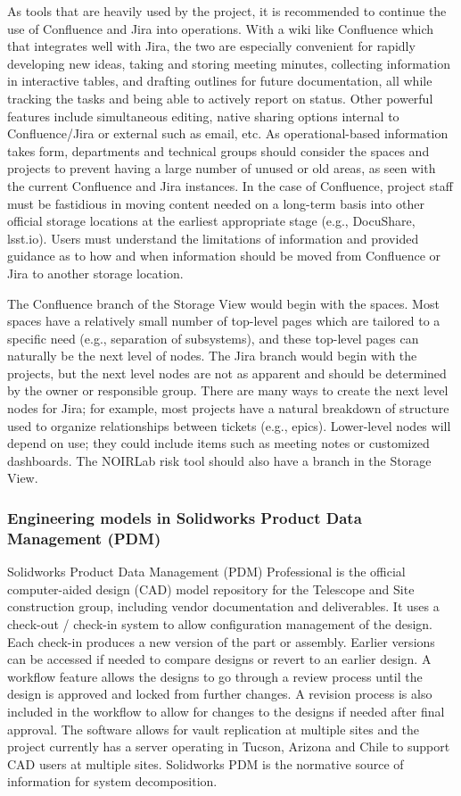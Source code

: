 As tools that are heavily used by the project, it is recommended to continue the use of Confluence and Jira into operations.
With a wiki like Confluence which that integrates well with Jira, the two are especially convenient for rapidly developing new ideas, taking and storing meeting minutes, collecting information in interactive tables, and drafting outlines for future documentation, all while tracking the tasks and being able to actively report on status.
Other powerful features include simultaneous editing, native sharing options internal to Confluence/Jira or external such as email, etc.
As operational-based information takes form, departments and technical groups should consider the spaces and projects to prevent having a large number of unused or old areas, as seen with the current Confluence and Jira instances.
In the case of Confluence, project staff must be fastidious in moving content needed on a long-term basis into other official storage locations at the earliest appropriate stage (e.g., DocuShare, lsst.io).
Users must understand the limitations of information and provided guidance as to how and when information should be moved from Confluence or Jira to another storage location.

The Confluence branch of the Storage View would begin with the spaces.
Most spaces have a relatively small number of top-level pages which are tailored to a specific need (e.g., separation of subsystems), and these top-level pages can naturally be the next level of nodes.
The Jira branch would begin with the projects, but the next level nodes are not as apparent and should be determined by the owner or responsible group.
There are many ways to create the next level nodes for Jira; for example, most projects have a natural breakdown of structure used to organize relationships between tickets (e.g., epics).
Lower-level nodes will depend on use; they could include items such as meeting notes or customized dashboards.
The NOIRLab risk tool should also have a branch in the Storage View.

\subsubsection{Engineering models in Solidworks Product Data Management (PDM)}

Solidworks Product Data Management (PDM) Professional \citep{PDM-cite} is the official computer-aided design (CAD) model repository for the Telescope and Site construction group, including vendor documentation and deliverables.
It uses a check-out / check-in system to allow configuration management of the design.
Each check-in produces a new version of the part or assembly.
Earlier versions can be accessed if needed to compare designs or revert to an earlier design.
A workflow feature allows the designs to go through a review process until the design is approved and locked from further changes.
A revision process is also included in the workflow to allow for changes to the designs if needed after final approval.
The software allows for vault replication at multiple sites and the project currently has a server operating in Tucson, Arizona and Chile to support CAD users at multiple sites.
Solidworks PDM is the normative source of information for system decomposition.

